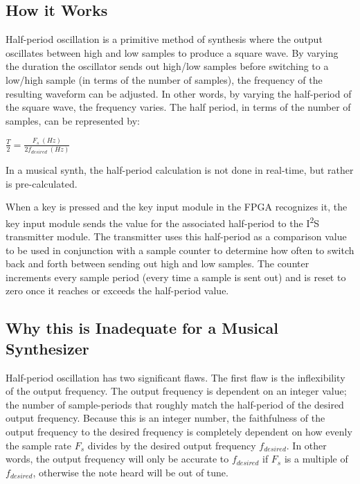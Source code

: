 \documentclass[conference]{IEEEtran}
\begin{document}
\subsection{How it Works}
Half-period oscillation is a primitive method of synthesis where the output oscillates between high and low samples to produce a square wave. By varying the duration the oscillator sends out high/low samples before switching to a low/high sample (in terms of the number of samples), the frequency of the resulting waveform can be adjusted. In other words, by varying the half-period of the square wave, the frequency varies. The half period, in terms of the number of samples, can be represented by:
% 
\begin{center}
    $\frac{T}{2} = \frac{F_s\ (Hz)}{2f_{desired}\ (Hz)}$
\end{center}
In a musical synth, the half-period calculation is not done in real-time, but rather is pre-calculated.

When a key is pressed and the key input module in the FPGA recognizes it, the key input module sends the value for the associated half-period to the I\textsuperscript{2}S transmitter module. The transmitter uses this half-period as a comparison value to be used in conjunction with a sample counter to determine how often to switch back and forth between sending out high and low samples. The counter increments every sample period (every time a sample is sent out) and is reset to zero once it reaches or exceeds the half-period value.

\subsection{Why this is Inadequate for a Musical Synthesizer}
Half-period oscillation has two significant flaws. The first flaw is the inflexibility of the output frequency. The output frequency is dependent on an integer value; the number of sample-periods that roughly match the half-period of the desired output frequency. Because this is an integer number, the faithfulness of the output frequency to the desired frequency is completely dependent on how evenly the sample rate $F_s$ divides by the desired output frequency $f_{desired}$. In other words, the output frequency will only be accurate to $f_{desired}$ if $F_s$ is a multiple of $f_{desired}$, otherwise the note heard will be out of tune.
\end{document}
